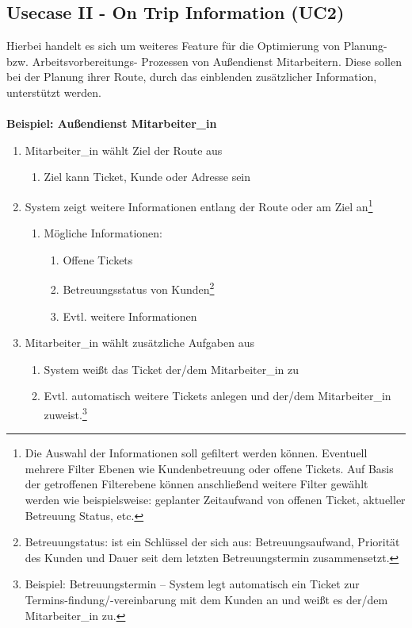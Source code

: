 \documentclass[Bachelorarbeit.tex]{subfiles}
\begin{document}
\subsection{Usecase II - On Trip Information (\ac{UC}2)}
Hierbei handelt es sich um weiteres Feature für die Optimierung von Planung- bzw. Arbeitsvorbereitungs- Prozessen von Außendienst Mitarbeitern. Diese sollen bei der Planung ihrer Route, durch das einblenden zusätzlicher Information, unterstützt werden. \\
\\
\textbf{Beispiel: Außendienst Mitarbeiter\_in}
\begin{enumerate}
	\item Mitarbeiter\_in wählt Ziel der Route aus 
	\begin{enumerate}
		\item Ziel kann Ticket, Kunde oder Adresse sein
	\end{enumerate}
	\item System zeigt weitere Informationen entlang der Route oder am Ziel an\footnote{Die Auswahl der Informationen soll gefiltert werden können. Eventuell mehrere Filter Ebenen wie Kundenbetreuung oder offene Tickets. Auf Basis der getroffenen Filterebene können anschließend weitere Filter gewählt werden wie beispielsweise: geplanter Zeitaufwand von offenen Ticket, aktueller Betreuung Status, etc. }
	\begin{enumerate}
		\item Mögliche Informationen:
		\begin{enumerate}
			\item Offene Tickets
			\item Betreuungsstatus von Kunden\footnote{Betreuungstatus: ist ein Schlüssel der sich aus: Betreuungsaufwand, Priorität des Kunden und Dauer seit dem letzten Betreuungstermin zusammensetzt.}
			\item Evtl. weitere Informationen
		\end{enumerate}
	\end{enumerate}
	\item Mitarbeiter\_in wählt zusätzliche Aufgaben aus
	\begin{enumerate}
		\item System weißt das Ticket der/dem Mitarbeiter\_in zu
		\item Evtl. automatisch weitere Tickets anlegen und der/dem Mitarbeiter\_in zuweist.\footnote{Beispiel: Betreuungstermin – System legt automatisch ein Ticket zur Termins-findung/-vereinbarung mit dem Kunden an und weißt es der/dem Mitarbeiter\_in zu.}
	\end{enumerate}
\end{enumerate}
\end{document}
